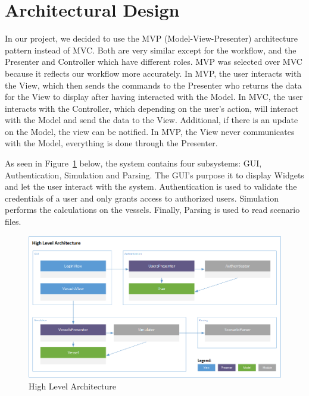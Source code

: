\documentclass[12pt]{article}
\begin{document}



\section{Architectural Design}
\par
In our project, we decided to use the MVP (Model-View-Presenter) architecture pattern instead of MVC. Both are very similar except for the workflow, and the Presenter and Controller which have different roles. MVP was selected over MVC because it reflects our workflow more accurately. In MVP, the user interacts with the View, which then sends the commands to the Presenter who returns the data for the View to display after having interacted with the Model. In MVC, the user interacts with the Controller, which depending on the user’s action, will interact with the Model and send the data to the View. Additional, if there is an update on the Model, the view can be notified. In MVP, the View never communicates with the Model, everything is done through the Presenter.
\par
As seen in Figure~\ref{fig:HighLevelArchitecture} below, the system contains four subsystems: GUI, Authentication, Simulation and Parsing. The GUI's purpose it to display Widgets and let the user interact with the system. Authentication is used to validate the credentials of a user and only grants access to authorized users. Simulation performs the calculations on the vessels. Finally, Parsing is used to read scenario files.

\begin{figure}[h!]
    \centering
    \includegraphics[scale=0.63]{4+1HighLevel}
    \caption{High Level Architecture}
    \label{fig:HighLevelArchitecture}
\end{figure}
\end{document}
